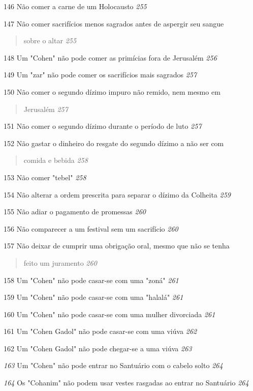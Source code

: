 146 Não comer a carne de um Holocausto \emph{255}

147 Não comer sacrifícios menos sagrados antes de aspergir seu sangue

\begin{quote}
sobre o altar \emph{255}
\end{quote}

148 Um "Cohen" não pode comer as primícias fora de Jerusalém \emph{256}

149 Um "zar" não pode comer os sacrifícios mais sagrados \emph{257}

150 Não comer o segundo dízimo impuro não remido, nem mesmo em

\begin{quote}
Jerusalém \emph{257}
\end{quote}

151 Não comer o segundo dízimo durante o período de luto \emph{257}

152 Não gastar o dinheiro do resgate do segundo dízimo a não ser com

\begin{quote}
comida e bebida \emph{258}
\end{quote}

153 Não comer "tebel" \emph{258}

154 Não alterar a ordem prescrita para separar o dízimo da Colheita
\emph{259}

155 Não adiar o pagamento de promessas \emph{260}

156 Não comparecer a um festival sem um sacrifício \emph{260}

157 Não deixar de cumprir uma obrigação oral, mesmo que não se tenha

\begin{quote}
feito um juramento \emph{260}
\end{quote}

158 Um "Cohen" não pode casar-se com uma "zoná" \emph{261}

159 Um "Cohen" não pode casar-se com uma "halalá" \emph{261}

160 Um "Cohen" não pode casar-se com uma mulher divorciada \emph{261}

161 Um "Cohen Gadol" não pode casar-se com uma viúva \emph{262}

162 Um "Cohen Gadol" não pode chegar-se a uma viúva \emph{263}

\emph{163} Um "Cohen" não pode entrar no Santuário com o cabelo solto
\emph{264}

\emph{164} Os "Cohanim" não podem usar vestes rasgadas ao entrar no
Santuário \emph{264}

